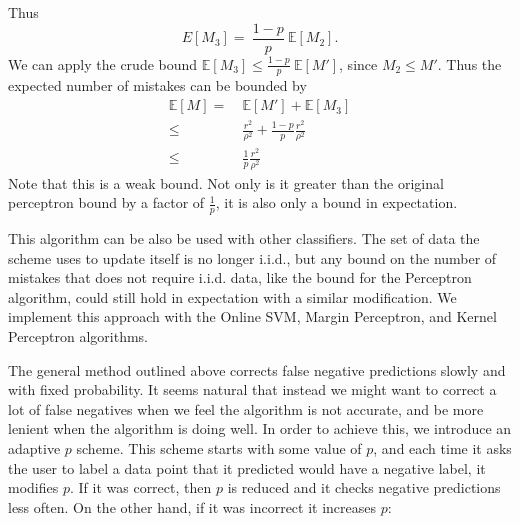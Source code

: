 \documentclass[12pt]{article}
\newcommand{\E}[0]{\mathbb{E}}
\begin{document}
Thus
\[
E[M_3] = \ \frac{1-p}{p}\ \E[M_2].
\]
We can apply the crude bound $\E[M_3] \leq \frac{1-p}{p}\ \E[M']$, since $M_2 \leq M'$. Thus the expected number of mistakes can be bounded by
\begin{align*}
\E[M]  =  &\ \E[M'] + \E[M_3] \\
\leq & \ \frac{r^2}{\rho^2} + \frac{1-p}{p}\frac{r^2}{\rho^2} \\
\leq  & \ \frac{1}{p}\frac{r^2}{\rho^2}
\end{align*}
Note that this is a weak bound.  Not only is it greater than the
original perceptron bound by a factor of $\frac{1}{p}$, it is also only a
bound in expectation.

This algorithm can be also be used with other classifiers.  The set of data the scheme uses to update itself is no longer i.i.d., but any bound on the number of mistakes that does not require i.i.d. data, like the bound for the Perceptron algorithm, could still hold in expectation with a similar modification. We implement this approach with the Online SVM, Margin Perceptron, and Kernel Perceptron algorithms.

The general method outlined above corrects false negative predictions slowly and with fixed probability.  It seems natural that instead we might want to correct a lot of false negatives when we feel the algorithm is not accurate, and be more lenient when the algorithm is doing well.  In order to achieve this, we introduce an adaptive $p$ scheme.  This scheme starts with some value of $p$, and each time it asks the user to label a data point that it predicted would have a negative label, it modifies $p$.  If it was correct, then $p$ is reduced and it checks negative predictions less often.  On the other hand, if it was incorrect it increases $p$: \\
\end{document}
